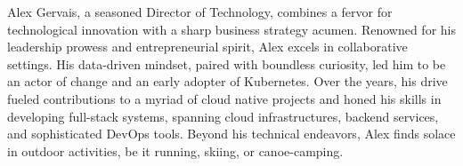 
\begin{cvparagraph}

Alex Gervais, a seasoned Director of Technology, combines a fervor for technological innovation with a sharp business strategy acumen. Renowned for his leadership prowess and entrepreneurial spirit, Alex excels in collaborative settings. His data-driven mindset, paired with boundless curiosity, led him to be an actor of change and an early adopter of Kubernetes. Over the years, his drive fueled contributions to a myriad of cloud native projects and honed his skills in developing full-stack systems, spanning cloud infrastructures, backend services, and sophisticated DevOps tools. Beyond his technical endeavors, Alex finds solace in outdoor activities, be it running, skiing, or canoe-camping.

\end{cvparagraph}